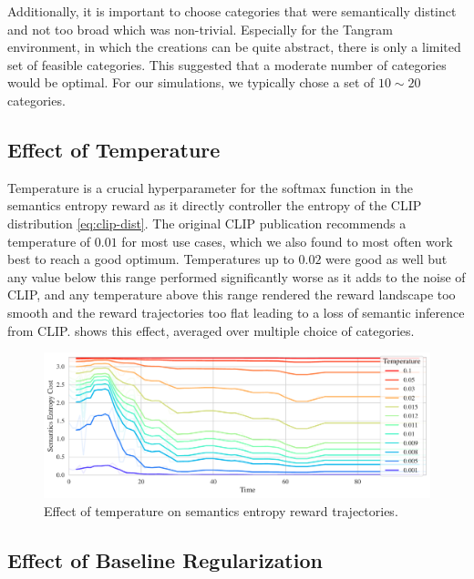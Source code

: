 Additionally, it is important to choose categories that were semantically distinct and not too broad which was non-trivial.
Especially for the Tangram environment, in which the creations can be quite abstract, there is only a limited set of feasible categories.
This suggested that a moderate number of categories would be optimal.
For our simulations, we typically chose a set of \(10 \sim 20\) categories.

\subsection{Effect of Temperature}
\label{sec:reg-temperature}

Temperature is a crucial hyperparameter for the softmax function in the semantics entropy reward as it directly controller the entropy of the CLIP distribution \eqref{eq:clip-dist}.
The original CLIP publication recommends a temperature of \(0.01\) for most use cases, which we also found to most often work best to reach a good optimum.
Temperatures up to \(0.02\) were good as well but any value below this range performed significantly worse as it adds to the noise of CLIP, and any temperature above this range rendered the reward landscape too smooth and the reward trajectories too flat leading to a loss of semantic inference from CLIP.
 shows this effect, averaged over multiple choice of categories.

\begin{figure}[H]
    \centering
    \includegraphics[width=\textwidth]{images/temperature_comparison.pdf}
    \caption{Effect of temperature on semantics entropy reward trajectories.}
    \label{fig:clip-temperature}    
\end{figure}

\subsection{Effect of Baseline Regularization}
\label{sec:reg-alpha-beta}

